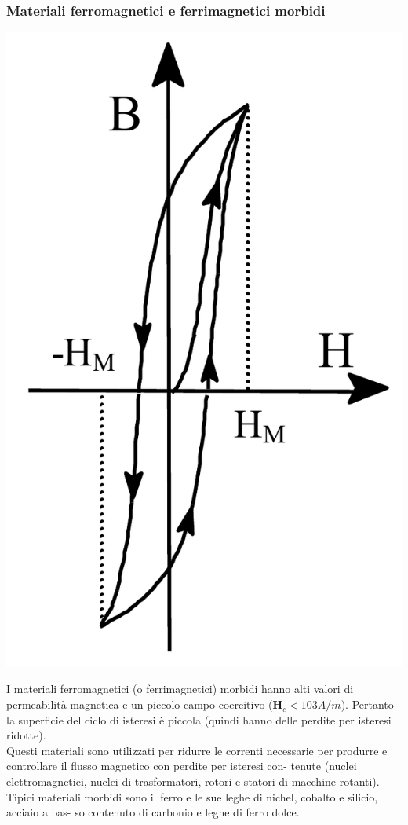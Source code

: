 \documentclass{article}
\begin{document}
\subsubsection{Materiali ferromagnetici e ferrimagnetici morbidi}
\begin{center}
    \includegraphics[scale=0.2]{Image/Isteresi_magnetica_3.png}
\end{center}
I materiali ferromagnetici (o ferrimagnetici)
morbidi hanno alti valori di permeabilità magnetica e un piccolo campo coercitivo ($\mathbf{H}_c < 103 A/m$). Pertanto la superficie del ciclo di isteresi è piccola (quindi hanno delle perdite per isteresi ridotte).\\
Questi materiali sono utilizzati per ridurre le
correnti necessarie per produrre e controllare
il flusso magnetico con perdite per isteresi con-
tenute (nuclei elettromagnetici, nuclei di trasformatori, rotori e statori di macchine rotanti).\\
Tipici materiali morbidi sono il ferro e le sue
leghe di nichel, cobalto e silicio, acciaio a bas-
so contenuto di carbonio e leghe di ferro dolce.
\end{document}
